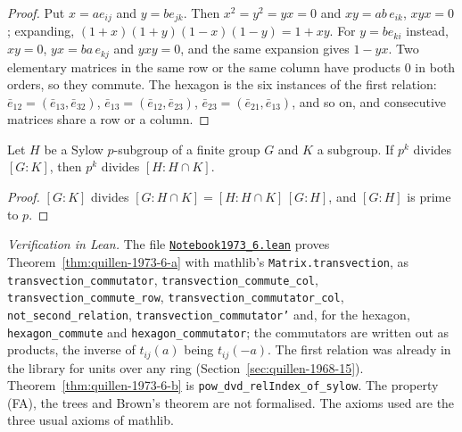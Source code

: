 \begin{proof}
Put $x = ae_{ij}$ and $y = be_{jk}$. Then $x^2 = y^2 = yx = 0$ and $xy = ab\,e_{ik}$, $xyx = 0$; expanding, $(1+x)(1+y)(1-x)(1-y) = 1 + xy$. For $y = be_{ki}$ instead, $xy = 0$, $yx = ba\,e_{kj}$ and $yxy = 0$, and the same expansion gives $1 - yx$. Two elementary matrices in the same row or the same column have products $0$ in both orders, so they commute. The hexagon is the six instances of the first relation: $\bar e_{12} = (\bar e_{13}, \bar e_{32})$, $\bar e_{13} = (\bar e_{12}, \bar e_{23})$, $\bar e_{23} = (\bar e_{21}, \bar e_{13})$, and so on, and consecutive matrices share a row or a column.
\end{proof}

\begin{encadre}
\begin{theoreme}\label{thm:quillen-1973-6-b}
Let $H$ be a Sylow $p$-subgroup of a finite group $G$ and $K$ a subgroup. If $p^k$ divides $[G : K]$, then $p^k$ divides $[H : H \cap K]$.
\end{theoreme}
\end{encadre}

\begin{proof}
$[G : K]$ divides $[G : H \cap K] = [H : H \cap K]\,[G : H]$, and $[G:H]$ is prime to $p$.
\end{proof}

{\raggedright \emph{Verification in Lean.} The file \href{\leanblobmain/Notebook1973_6.lean}{\texttt{Notebook1973\_6.\allowbreak{}lean}} proves Theorem~\ref{thm:quillen-1973-6-a} with mathlib's \texttt{Matrix.transvection}, as \texttt{transvection\_commutator}, \texttt{transvection\_commute\_col}, \texttt{transvection\_commute\_row}, \texttt{transvection\_commutator\_col}, \texttt{not\_second\_relation}, \texttt{transvection\_commutator'} and, for the hexagon, \texttt{hexagon\_commute} and \texttt{hexagon\_commutator}; the commutators are written out as products, the inverse of $t_{ij}(a)$ being $t_{ij}(-a)$. The first relation was already in the library for units over any ring (Section~\ref{sec:quillen-1968-15}). Theorem~\ref{thm:quillen-1973-6-b} is \texttt{pow\_dvd\_relIndex\_of\_sylow}. The property (FA), the trees and Brown's theorem are not formalised. The axioms used are the three usual axioms of mathlib.\par}

